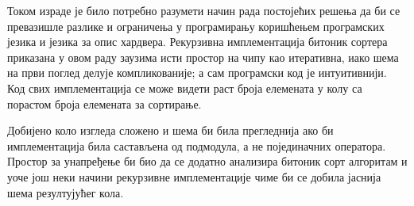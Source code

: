 \documentclass[12pt, a4paper]{article}
\theoremstyle{definition}
\begin{document}
Током израде је било потребно разумети начин рада постојећих решења да би се превазишле разлике и ограничења у програмирању коришћењем програмских језика и језика за опис хардвера.
Рекурзивна имплементација битоник сортера приказана у овом раду заузима исти простор на чипу као итеративна, иако шема на први поглед делује компликованије; а сам програмски код је интуитивнији. Код свих имплементација се може видети раст броја елемената у колу са порастом броја елемената за сортирање.

Добијено коло изгледа сложено и шема би била прегледнија ако би имплементација била састављена од подмодула, а не појединачних оператора. Простор за унапређење би био да се додатно анализира битоник сорт алгоритам и уоче још неки начини рекурзивне имплементације чиме би се добила јаснија шема резултујућег кола.



\clearpage
\begingroup
\raggedright
%
\end{document}
